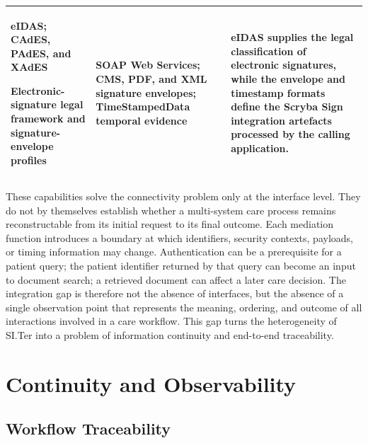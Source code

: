 \begin{table}[H]
\begin{tabular}{|>{\raggedright\arraybackslash}p{3.0cm}|>{\raggedright\arraybackslash}p{4.0cm}|>{\raggedright\arraybackslash}p{5.4cm}|}
    \hline
    \rowcolor{tableGray}
    \textbf{eIDAS; CAdES, PAdES, and XAdES}\par
    {\footnotesize Electronic-signature legal framework and signature-envelope profiles}
    & SOAP Web Services; CMS, PDF, and XML signature envelopes; TimeStampedData temporal evidence
    & eIDAS supplies the legal classification of electronic signatures, while the envelope and timestamp formats define the Scryba Sign integration artefacts processed by the calling application. \\
    \hline
\end{tabular}
\end{table}
\endgroup

\noindent These capabilities solve the connectivity problem only at the interface level. They do
not by themselves establish whether a multi-system care process remains
reconstructable from its initial request to its final outcome. Each mediation function introduces a boundary at which identifiers, security
contexts, payloads, or timing information may change. Authentication can be a
prerequisite for a patient query; the patient identifier returned by that query
can become an input to document search; a retrieved document can affect a later
care decision. The integration gap is therefore not the absence of interfaces,
but the absence of a single observation point that represents the meaning,
ordering, and outcome of all interactions involved in a care workflow. This gap
turns the heterogeneity of SI.Ter into a problem of information continuity and
end-to-end traceability.


\section{Continuity and Observability}
\label{sec:problem-to-question}

\subsection{Workflow Traceability}
\label{sec:general-problem}

